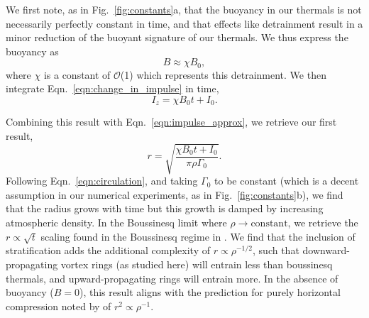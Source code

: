 \documentclass[twocolumn, amsmath, amsfonts, amssymb, trackchanges]{aastex62}
\newcommand{\LJ}{\citetalias{lecoanet&jeevanjee2018}}
\begin{document}
We first note, as in Fig.~\ref{fig:constants}a, that the buoyancy in our thermals is not necessarily perfectly constant in time, and that effects like detrainment result in a minor reduction of the buoyant signature of our thermals. 
We thus express the buoyancy as 
\begin{equation}
B \approx \chi B_0,
\end{equation}
where $\chi$ is a constant of $\mathcal{O}$(1) which represents this detrainment. 
We then integrate Eqn.~\ref{eqn:change_in_impulse} in time,
\begin{equation*}
I_z = \chi B_0 t + I_0.
\end{equation*}

Combining this result with Eqn.~\ref{eqn:impulse_approx}, we retrieve our first result,
\begin{equation}
r = \sqrt{\frac{\chi B_0 t + I_0}{\pi\rho\Gamma_0}}.
\label{eqn:r_theory}
\end{equation}
Following Eqn.~\ref{eqn:circulation}, and taking $\Gamma_0$ to be constant (which is a decent assumption in our numerical experiments, as in Fig.~\ref{fig:constants}b), we find that the radius grows with time but this growth is damped by increasing atmospheric density.
In the Boussinesq limit where $\rho \rightarrow \text{constant}$, we retrieve the $r \propto \sqrt{t}$ scaling found in the Boussinesq regime in \LJ. 
We find that the inclusion of stratification adds the additional complexity of $r \propto \rho^{-1/2}$, such that downward-propagating vortex rings (as studied here) will entrain less than boussinesq thermals, and upward-propagating rings will entrain more. 
In the absence of buoyancy ($B = 0$), this result aligns with the prediction for purely horizontal compression noted by \citet{brandenburg2016} of $r^2 \propto \rho^{-1}$.
\end{document}
